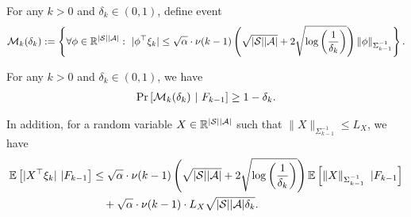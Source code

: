 For any $k>0$ and $\delta_k \in (0,1)$, define event
\begin{align*}
	\mathcal{M}_k(\delta_k):=\left\{  \forall \phi \in \mathbb{R}^{|\mathcal{S}||\mathcal{A}|} :\  |\phi^\top \xi_k| \leq \sqrt{\alpha} \cdot \nu(k-1) \left(  \sqrt{|\mathcal{S}||\mathcal{A}|} + 2 \sqrt{\log\left( \frac{1}{\delta_k} \right)}  \right) \left\| \phi \right\|_{\Sigma_{k-1}^{-1}}  \right\} .
\end{align*}

\begin{lemma} \label{lemma:X_top_xi_k}
	For any $k>0$ and $\delta_k \in (0,1)$, we have
	\begin{align*}
		\Pr\left[  \mathcal{M}_k(\delta_k) \ |\ F_{k-1}  \right] \geq 1 - \delta_k .
	\end{align*}
	
	In addition, for a random variable $X \in \mathbb{R}^{|\mathcal{S}| |\mathcal{A}|}$ such that $\|X\|_{\Sigma_{k-1}^{-1}} \leq L_{X}$, we have
	\begin{align*}
		\mathbb{E}\left[ |X^\top \xi_k| \ | F_{k-1} \right] 
		&\leq \sqrt{\alpha} \cdot \nu(k-1) \left(  \sqrt{|\mathcal{S}||\mathcal{A}|} + 2 \sqrt{\log\left( \frac{1}{\delta_k} \right)}  \right) \mathbb{E}\left[  \left\| X \right\|_{\Sigma_{k-1}^{-1}} \ | F_{k-1} \right] 
		\\
		&\quad + \sqrt{\alpha} \cdot \nu(k-1) \cdot L_{X} \sqrt{ |\mathcal{S}| |\mathcal{A}| \delta_k } .
	\end{align*}
\end{lemma}

